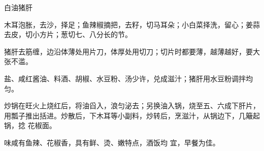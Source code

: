 \begin{recipe}{白油猪肝}

\ingredients


\preparation

\step 木耳泡胀，去沙，择足；鱼辣椒摘把，去籽，切马耳朵；小白菜择洗，留心；姜蒜
去皮，切小方片；葱切七、八分长的节。

\step 猪肝去筋缠，边沿体薄处用片刀，体厚处用切刀；切片时都要薄，越薄越好，要大
张不滥。

\step 盐、咸红酱油、料酒、胡椒、水豆粉、汤少许，兑成滋汁；猪肝用水豆粉调拌均匀。

\step 炒锅在旺火上烧红后，将油舀入，浪匀泌去；另换油入锅，烧至五、六成下肝片，
用瓢子推出括进。炒散后，下木耳等小副料，炒转后，烹滋汁，从锅边下，几簸起锅，捻
花椒面。

\features

味咸有鱼辣、花椒香，具有鲜、烫、嫩特点，酒饭均 宜，早餐为佳。

\end{recipe}


